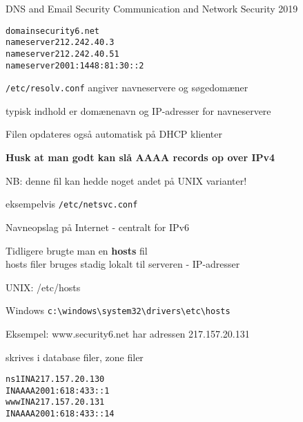 \documentclass[Screen16to9,17pt]{foils}
\begin{document}
\mytitlepage
{DNS and Email Security}
{Communication and Network Security 2019}





\begin{alltt}
domain security6.net
nameserver 212.242.40.3
nameserver 212.242.40.51
nameserver 2001:1448:81:30::2
\end{alltt}

\begin{list1}
\item \verb+/etc/resolv.conf+ angiver navneservere og søgedomæner
\item typisk indhold er domænenavn og IP-adresser for navneservere
\item Filen opdateres også automatisk på DHCP klienter
\item {\bf Husk at man godt kan slå AAAA records op over IPv4}
\item NB: denne fil kan hedde noget andet på UNIX varianter!
\item eksempelvis \verb+/etc/netsvc.conf+
\end{list1}


\begin{list1}
\item Navneopslag på Internet - centralt for IPv6
\item Tidligere brugte man en {\bfseries hosts} fil\\
hosts filer bruges stadig lokalt til serveren - IP-adresser
\item UNIX: /etc/hosts
\item Windows \verb+c:\windows\system32\drivers\etc\hosts+
\item Eksempel: www.security6.net har adressen 217.157.20.131
\item skrives i database filer, zone filer
\end{list1}

\begin{alltt}
ns1     IN      A       217.157.20.130
        IN      AAAA    2001:618:433::1
www     IN      A       217.157.20.131
        IN      AAAA    2001:618:433::14
\end{alltt}

\end{document}
